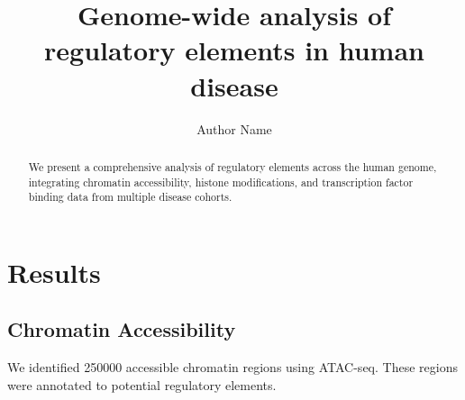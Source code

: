 \documentclass{article}
\title{Genome-wide analysis of regulatory elements in human disease}
\author{Author Name}
\begin{document}
\maketitle

\begin{abstract}
We present a comprehensive analysis of regulatory elements across the human genome,
integrating chromatin accessibility, histone modifications, and transcription factor
binding data from multiple disease cohorts.
\end{abstract}

\section{Results}

\subsection{Chromatin Accessibility}

We identified \num{250000} accessible chromatin regions using ATAC-seq.
These regions were annotated to potential regulatory elements.
\end{document}
